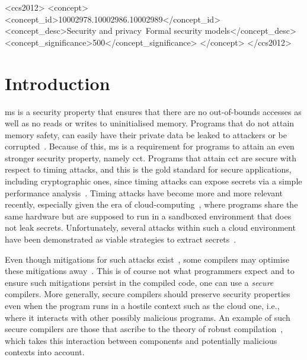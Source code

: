 \documentclass[utf8,acmsmall,review,screen,dvipsnames,anonymous]{acmart}
\begin{document}
\begin{CCSXML}
<ccs2012>
  <concept>
  <concept_id>10002978.10002986.10002989</concept_id>
  <concept_desc>Security and privacy~Formal security models</concept_desc>
  <concept_significance>500</concept_significance>
  </concept>
</ccs2012>
\end{CCSXML}


\maketitle

\section{Introduction}\label{sec:introduction}

\gls{ms} is a security property that ensures that there are no out-of-bounds accesses as well as no reads or writes to uninitialised memory.
Programs that do not attain memory safety, can easily have their private data be leaked to attackers or be corrupted~\cite{lemay2021ccc}.
Because of this, \gls{ms} is a requirement for programs to attain an even stronger security property, namely \gls{cct}.
Programs that attain \gls{cct} are secure with respect to timing attacks, and this is the gold standard for secure applications, including cryptographic ones, since timing attacks can expose secrets via a simple performance analysis~\cite{kocher1996timing}.
Timing attacks have become more and more relevant recently, especially given the era of cloud-computing~\cite{aviram2010cloudtime,kumar2019cloudsecsurvey}, where programs share the same hardware but are supposed to run in a sandboxed environment that does not leak secrets.
Unfortunately, several attacks within such a cloud environment have been demonstrated as viable strategies to extract secrets~\cite{mehmet2015getoff,flowers2022zeroday,atya2019catchme,venkatanathan2015placevul}.

Even though mitigations for such attacks exist~\cite{bond2017vale,almeida2017jasmin}, some compilers may optimise these mitigations away~\cite{barthe2018sec}.
This is of course not what programmers expect and to ensure such mitigations persist in the compiled code, one can use a {\em secure} compilers.
More generally, secure compilers should preserve security properties even when the program runs in a hostile context such as the cloud one, i.e., where it interacts with other possibly malicious programs.
An example of such secure compilers are those that ascribe to the theory of robust compilation~\cite{abate2019jour,abate2021extacc,patrignani2021rsc}, which takes this interaction between components and potentially malicious contexts into account.
\end{document}
